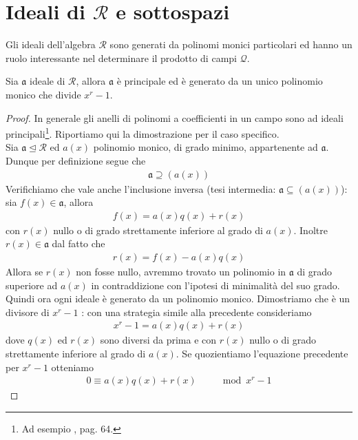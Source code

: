 \section{Ideali di $\mathcal{R}$ e sottospazi}
Gli ideali dell'algebra $\mathcal{R}$ sono generati da polinomi monici particolari ed hanno un ruolo interessante nel determinare il prodotto di campi $\mathcal{Q}$.

\begin{teorema} \label{teo:genDiIdeali}
   Sia $\mathfrak{a}$ ideale di $\mathcal{R}$, allora $\mathfrak{a}$ è principale ed è generato da un unico polinomio monico che divide $x^r - 1$.
\end{teorema}
\begin{proof}
   In generale gli anelli di polinomi a coefficienti in un campo sono ad ideali principali\footnote{Ad esempio \cite{berardi}, pag. 64.}. Riportiamo qui la dimostrazione per il caso specifico. \\
   Sia $\mathfrak{a} \unlhd \mathcal{R}$ ed $a(x)$ polinomio monico, di grado minimo, appartenente ad $\mathfrak{a}$. Dunque per definizione segue che
   \begin{align*}
      \mathfrak{a} \supseteq (a(x))
   \end{align*}
   Verifichiamo che vale anche l'inclusione inversa (tesi intermedia: $\mathfrak{a} \subseteq (a(x))$):
   sia $f(x) \in \mathfrak{a}$, allora
   \begin{align*}
      f(x) = a(x)q(x) + r(x)
   \end{align*}
   con $r(x)$ nullo o di grado strettamente inferiore al grado di $a(x)$. Inoltre $r(x) \in \mathfrak{a}$ dal fatto che
   \begin{align*}
      r(x) = f(x) - a(x)q(x)
   \end{align*}
   Allora se $r(x)$ non fosse nullo, avremmo trovato un polinomio in $\mathfrak{a}$ di grado superiore ad $a(x)$ in contraddizione con l'ipotesi di minimalità del suo grado.\\
   Quindi ora ogni ideale è generato da un polinomio monico. Dimostriamo che è un divisore di $x^r-1$ :
   con una strategia simile alla precedente consideriamo
   \begin{align*}
      x^r - 1 = a(x)q(x) + r(x)
   \end{align*}
   dove $q(x)$ ed $r(x)$ sono diversi da prima e con $r(x)$ nullo o di grado strettamente inferiore al grado di $a(x)$. Se quozientiamo l'equazione precedente per $x^r - 1$ otteniamo
   \begin{align*}
      0 \equiv a(x)q(x) + r(x) \qquad \mod{x^r - 1}

\end{align*}
\end{proof}
